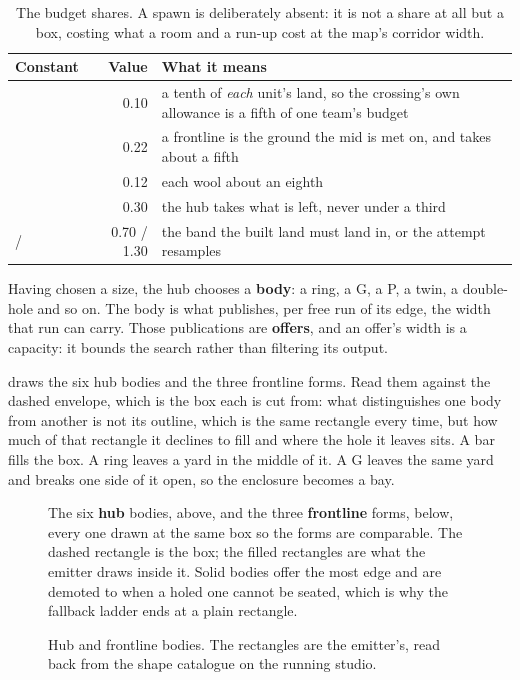 \begin{table}[htbp]
\caption{The budget shares. A spawn is deliberately absent: it is not a share at
all but a box, costing what a room and a run-up cost at the map's corridor width.}
\label{tab:shares}
\small
\begin{tabularx}{\textwidth}{L{3.4cm} r Y}
\toprule
\textbf{Constant} & \textbf{Value} & \textbf{What it means} \\
\midrule
{} & 0.10 & a tenth of \emph{each} unit's land, so the crossing's own
  allowance is a fifth of one team's budget \\
 & 0.22 & a frontline is the ground the mid is met on, and
  takes about a fifth \\
 & 0.12 & each wool about an eighth \\
 & 0.30 & the hub takes what is left, never under a third \\
 /  & 0.70 / 1.30 & the band the built land must
  land in, or the attempt resamples \\
\bottomrule
\end{tabularx}
\end{table}

Having chosen a size, the hub chooses a \textbf{body}: a ring, a G, a P, a twin, a
double-hole and so on. The body is what publishes, per free run of its edge, the
width that run can carry. Those publications are \textbf{offers},
and an offer's width is a capacity: it bounds the search rather than filtering its
output.

 draws the six hub bodies and the three frontline forms. Read them
against the dashed envelope, which is the box each is cut from: what distinguishes
one body from another is not its outline, which is the same rectangle every time,
but how much of that rectangle it declines to fill and where the hole it leaves
sits. A bar fills the box. A ring leaves a yard in the middle of it. A G leaves the
same yard and breaks one side of it open, so the enclosure becomes a bay.

\begin{figure}[htbp]
\centering


\medskip
{\small\begin{minipage}{0.95\textwidth}
The six \textbf{hub} bodies, above, and the three \textbf{frontline} forms, below,
every one drawn at the same box so the forms are comparable. The dashed rectangle is
the box; the filled rectangles are what the emitter draws inside it. Solid bodies
offer the most edge and are demoted to when a holed one cannot be seated, which is
why the fallback ladder ends at a plain rectangle.
\end{minipage}}
\caption{Hub and frontline bodies. The rectangles are the emitter's, read back from
the shape catalogue on the running studio.}
\label{fig:bodies}
\end{figure}

